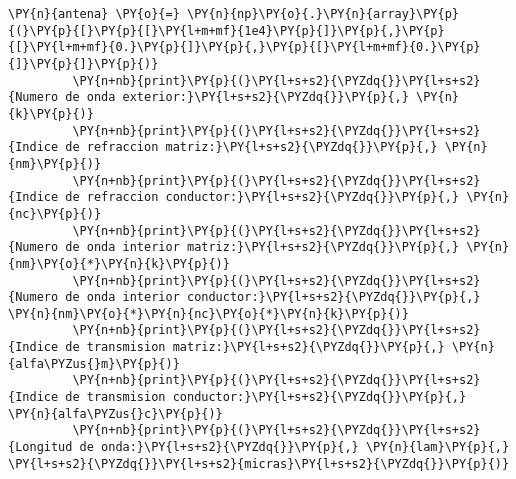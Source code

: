 \documentclass[11pt]{report}
\begin{document}
\begin{tcolorbox}
\begin{Verbatim}[commandchars=\\\{\}]
         \PY{n}{antena} \PY{o}{=} \PY{n}{np}\PY{o}{.}\PY{n}{array}\PY{p}{(}\PY{p}{[}\PY{p}{[}\PY{l+m+mf}{1e4}\PY{p}{]}\PY{p}{,}\PY{p}{[}\PY{l+m+mf}{0.}\PY{p}{]}\PY{p}{,}\PY{p}{[}\PY{l+m+mf}{0.}\PY{p}{]}\PY{p}{]}\PY{p}{)}
         \PY{n+nb}{print}\PY{p}{(}\PY{l+s+s2}{\PYZdq{}}\PY{l+s+s2}{Numero de onda exterior:}\PY{l+s+s2}{\PYZdq{}}\PY{p}{,} \PY{n}{k}\PY{p}{)}
         \PY{n+nb}{print}\PY{p}{(}\PY{l+s+s2}{\PYZdq{}}\PY{l+s+s2}{Indice de refraccion matriz:}\PY{l+s+s2}{\PYZdq{}}\PY{p}{,} \PY{n}{nm}\PY{p}{)}
         \PY{n+nb}{print}\PY{p}{(}\PY{l+s+s2}{\PYZdq{}}\PY{l+s+s2}{Indice de refraccion conductor:}\PY{l+s+s2}{\PYZdq{}}\PY{p}{,} \PY{n}{nc}\PY{p}{)}
         \PY{n+nb}{print}\PY{p}{(}\PY{l+s+s2}{\PYZdq{}}\PY{l+s+s2}{Numero de onda interior matriz:}\PY{l+s+s2}{\PYZdq{}}\PY{p}{,} \PY{n}{nm}\PY{o}{*}\PY{n}{k}\PY{p}{)}
         \PY{n+nb}{print}\PY{p}{(}\PY{l+s+s2}{\PYZdq{}}\PY{l+s+s2}{Numero de onda interior conductor:}\PY{l+s+s2}{\PYZdq{}}\PY{p}{,} \PY{n}{nm}\PY{o}{*}\PY{n}{nc}\PY{o}{*}\PY{n}{k}\PY{p}{)}
         \PY{n+nb}{print}\PY{p}{(}\PY{l+s+s2}{\PYZdq{}}\PY{l+s+s2}{Indice de transmision matriz:}\PY{l+s+s2}{\PYZdq{}}\PY{p}{,} \PY{n}{alfa\PYZus{}m}\PY{p}{)}
         \PY{n+nb}{print}\PY{p}{(}\PY{l+s+s2}{\PYZdq{}}\PY{l+s+s2}{Indice de transmision conductor:}\PY{l+s+s2}{\PYZdq{}}\PY{p}{,} \PY{n}{alfa\PYZus{}c}\PY{p}{)}
         \PY{n+nb}{print}\PY{p}{(}\PY{l+s+s2}{\PYZdq{}}\PY{l+s+s2}{Longitud de onda:}\PY{l+s+s2}{\PYZdq{}}\PY{p}{,} \PY{n}{lam}\PY{p}{,} \PY{l+s+s2}{\PYZdq{}}\PY{l+s+s2}{micras}\PY{l+s+s2}{\PYZdq{}}\PY{p}{)}
\end{Verbatim}
\end{tcolorbox}
\end{document}
